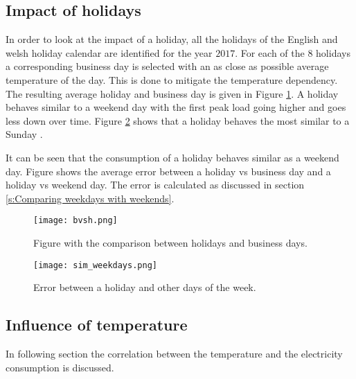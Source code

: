 \subsection{Impact of holidays}\label{s:Impact of holidays}
In order to look at the impact of a holiday, all the holidays of the English and welsh holiday calendar are identified for the year $ 2017 $. For each of the $ 8 $ holidays a corresponding business day is selected with an as close as possible average temperature of the day. This is done to mitigate the temperature dependency. The resulting average holiday and business day is given in Figure \ref{fig:bvsh}. A holiday behaves similar to a weekend day with the first peak load going higher and goes less down over time. Figure \ref{fig:sim_weekdays} shows that a holiday behaves the most similar to a Sunday .

It can be seen that the consumption of a holiday behaves similar as a weekend day. Figure shows the average error between a holiday vs business day and a holiday vs weekend day. The error is calculated as discussed in section \ref{s:Comparing weekdays with weekends}. 

\begin{figure}[h!]
	\centering
	\texttt{[image: bvsh.png]}
	\caption{Figure with the comparison between holidays and business days.}
	\label{fig:bvsh}
\end{figure}

\begin{figure}[h!]
	\centering
	\texttt{[image: sim\_weekdays.png]}
	\caption{Error between a holiday and other days of the week.}
	\label{fig:sim_weekdays}
\end{figure}


\subsection{Influence of temperature}
In following section the correlation between the temperature and the electricity consumption is discussed.\\


